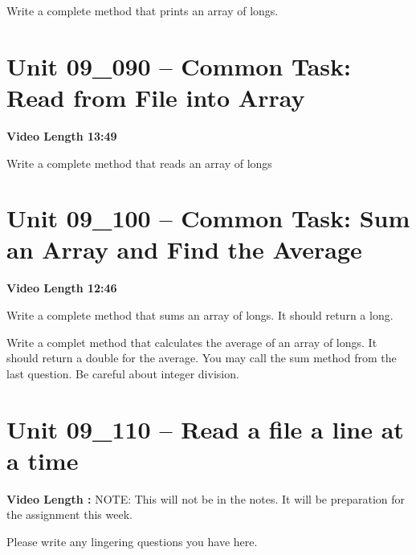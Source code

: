 \documentclass[letterpaper,12pt]{exam}
\newcommand{\unit}{Unit 09}
\begin{document}
\begin{questions}
\begin{samepage}
    \question Write a complete method that prints an array of longs.
    \vspace{5mm}
\end{samepage}
\clearpage

\section*{\unit\_090 -- Common Task: Read from File into Array} 
\par{\selectfont\textbf{Video Length 13:49}}
\begin{samepage}
    \question Write a complete method that reads an array of longs
    \vspace{55mm}
\end{samepage}

\section*{\unit\_100 -- Common Task: Sum an Array and Find the Average} 
\par{\selectfont\textbf{Video Length 12:46}}
\begin{samepage}
    \question Write a complete method that sums an array of longs.  It should return a long.
    \vspace{55mm}
\end{samepage}
\clearpage
\begin{samepage}
    \question Write a complet method that calculates the average of an array of longs.  It should return a double for the average.  You may call the sum method from the last question.  Be careful about integer division.
    \vspace{45mm}
\end{samepage}

\section*{\unit\_110 -- Read a file a line at a time } 
\par{\selectfont\textbf{Video Length :}}
NOTE:  This will not be in the notes.  It will be preparation for the assignment this week.

Please write any lingering questions you have here.


\end{questions}
\end{document}
